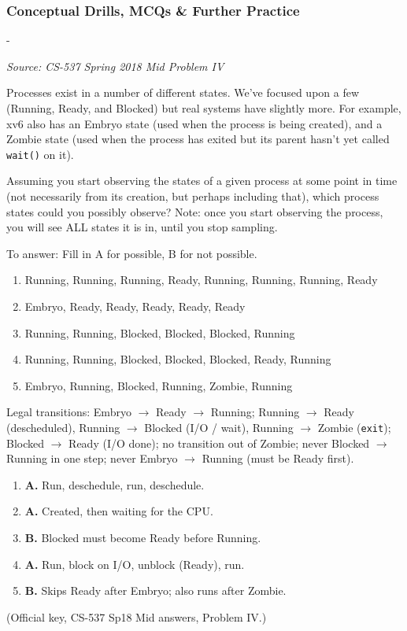 \documentclass[11pt,a4paper]{article}
\makeatletter
\newcommand{\keepspace}[1]{\par\penalty-100\begingroup
  \setlength{\dimen@}{#1}\dimen@ii\pagegoal\advance\dimen@ii-\pagetotal
  \ifdim\dimen@>\dimen@ii\ifdim\dimen@ii>\z@\vfil\fi\break\fi\endgroup}
\newcounter{qn}[section]
\newenvironment{Qn}[4]{%
  \refstepcounter{qn}\keepspace{7\baselineskip}%
  \begin{tcolorbox}[qboxstyle, title={Q\thesection.\theqn\ \ [#1 \textbar\ #2]\ \ #4}]%
  {\footnotesize\color{g3}\textit{Source: #3}}\par\smallskip%
}{%
  \end{tcolorbox}%
}
\newenvironment{Sol}{%
  \begin{tcolorbox}[sboxstyle, title={Solution}]%
}{%
  \end{tcolorbox}\vspace{0.35em}%
}
\makeatother
\begin{document}
\subsubsection*{Conceptual Drills, MCQs \& Further Practice}

\begin{Qn}{Easy-Medium}{Lect 2}{CS-537 Spring 2018 Mid Problem IV}{Which process-state traces are possible?}
Processes exist in a number of different states. We've focused upon a few (Running, Ready, and Blocked) but real systems have slightly more. For example, xv6 also has an Embryo state (used when the process is being created), and a Zombie state (used when the process has exited but its parent hasn't yet called \texttt{wait()} on it).

Assuming you start observing the states of a given process at some point in time (not necessarily from its creation, but perhaps including that), which process states could you possibly observe? Note: once you start observing the process, you will see ALL states it is in, until you stop sampling.

To answer: Fill in A for possible, B for not possible.
\begin{enumerate}
  \item[16.] Running, Running, Running, Ready, Running, Running, Running, Ready
  \item[17.] Embryo, Ready, Ready, Ready, Ready, Ready
  \item[18.] Running, Running, Blocked, Blocked, Blocked, Running
  \item[19.] Running, Running, Blocked, Blocked, Blocked, Ready, Running
  \item[20.] Embryo, Running, Blocked, Running, Zombie, Running
\end{enumerate}
\end{Qn}
\begin{Sol}
Legal transitions: Embryo $\to$ Ready $\to$ Running; Running $\to$ Ready (descheduled), Running $\to$ Blocked (I/O / wait), Running $\to$ Zombie (\texttt{exit}); Blocked $\to$ Ready (I/O done); no transition out of Zombie; never Blocked $\to$ Running in one step; never Embryo $\to$ Running (must be Ready first).
\begin{enumerate}
  \item[16.] \textbf{A.} Run, deschedule, run, deschedule.
  \item[17.] \textbf{A.} Created, then waiting for the CPU.
  \item[18.] \textbf{B.} Blocked must become Ready before Running.
  \item[19.] \textbf{A.} Run, block on I/O, unblock (Ready), run.
  \item[20.] \textbf{B.} Skips Ready after Embryo; also runs after Zombie.
\end{enumerate}
(Official key, CS-537 Sp18 Mid answers, Problem IV.)
\end{Sol}
\end{document}
